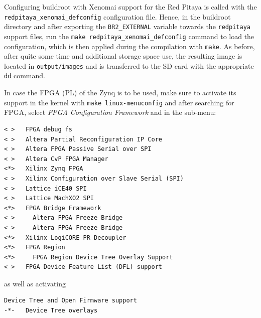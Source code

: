 \documentclass{article}
\begin{document}
{{Configuring buildroot with Xenomai support for the Red Pitaya is called with the
{\tt redpitaya\_xenomai\_defconfig} configuration file. Hence, in the buildroot directory
and after exporting the {\tt BR2\_EXTERNAL} variable towards the {\tt redpitaya} support files,
run the {\tt make redpitaya\_xenomai\_defconfig} command to load the configuration, which is
then applied during the compilation with {\tt make}. As before, after quite some time and
additional storage space use, the resulting image is located in {\tt output/images} and is
transferred to the SD card with the appropriate {\tt dd} command.

In case the FPGA (PL) of the Zynq is to be used, make sure to activate its support in the kernel
with {\tt make linux-menuconfig} and after searching for FPGA, select {\em FPGA Configuration 
Framework} and in the sub-menu:

\begin{verbatim}
< >   FPGA debug fs
< >   Altera Partial Reconfiguration IP Core
< >   Altera FPGA Passive Serial over SPI 
< >   Altera CvP FPGA Manager 
<*>   Xilinx Zynq FPGA      
< >   Xilinx Configuration over Slave Serial (SPI)
< >   Lattice iCE40 SPI
< >   Lattice MachXO2 SPI
<*>   FPGA Bridge Framework
< >     Altera FPGA Freeze Bridge
< >     Altera FPGA Freeze Bridge
<*>   Xilinx LogiCORE PR Decoupler
<*>   FPGA Region
<*>     FPGA Region Device Tree Overlay Support
< >   FPGA Device Feature List (DFL) support
\end{verbatim}

as well as activating

\begin{verbatim}
Device Tree and Open Firmware support
-*-   Device Tree overlays
\end{verbatim}

}}
\end{document}
